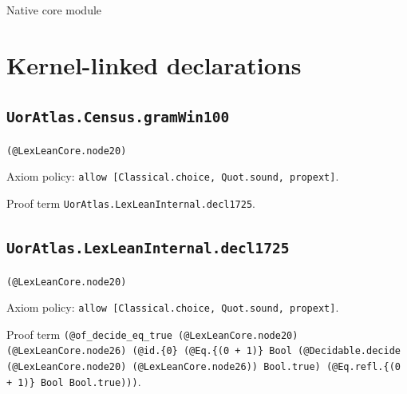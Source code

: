 \documentclass[11pt]{article}
\begin{document}
\begin{center}{\LARGE Native core module}\end{center}
\section*{Kernel-linked declarations}
\subsection*{\texttt{UorAtlas.Census.gramWin100}}
\noindent\texttt{(@LexLeanCore.node20)}\par
\noindent Axiom policy: \texttt{allow [Classical.choice, Quot.sound, propext]}.\par
\noindent Proof term \texttt{UorAtlas.LexLeanInternal.decl1725}.\par
\subsection*{\texttt{UorAtlas.LexLeanInternal.decl1725}}
\noindent\texttt{(@LexLeanCore.node20)}\par
\noindent Axiom policy: \texttt{allow [Classical.choice, Quot.sound, propext]}.\par
\noindent Proof term \texttt{(@of\_decide\_eq\_true (@LexLeanCore.node20) (@LexLeanCore.node26) (@id.\{0\} (@Eq.\{(0 + 1)\} Bool (@Decidable.decide (@LexLeanCore.node20) (@LexLeanCore.node26)) Bool.true) (@Eq.refl.\{(0 + 1)\} Bool Bool.true)))}.\par
\end{document}
